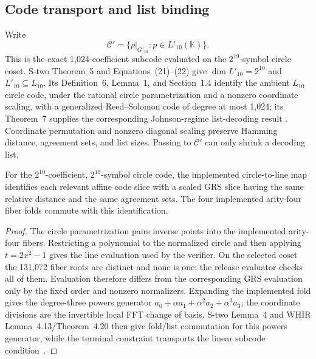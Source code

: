 \subsection{Code transport and list binding}

Write
\[
 \mathcal C'=
 \{p|_{G'_{19}}:p\in L'_{10}(\mathbb K)\}.
\]
This is the exact 1,024-coefficient subcode evaluated on the
\(2^{19}\)-symbol circle coset.  S-two Theorem~5 and
Equations~(21)--(22) give \(\dim L'_{10}=2^{10}\) and
\(L'_{10}\subseteq L_{10}\).  Its Definition~6, Lemma~1, and Section~1.4
identify the ambient \(L_{10}\) circle code, under the rational circle
parametrization and a nonzero coordinate scaling, with a generalized
Reed--Solomon code of degree at most 1,024; its Theorem~7 supplies the
corresponding Johnson-regime list-decoding result
\cite{CarmonEtAl2026Stwo}.  Coordinate permutation and nonzero diagonal
scaling preserve Hamming distance, agreement sets, and list sizes.  Passing
to \(\mathcal C'\) can only shrink a decoding list.

\begin{lemma}
\label{lem:circle-grs-transport}
For the \(2^{10}\)-coefficient, \(2^{19}\)-symbol \Profile{} circle code,
the implemented circle-to-line map identifies each relevant affine code
slice with a scaled GRS slice having the same relative distance and the same
agreement sets.  The four implemented arity-four fiber folds commute with
this identification.
\end{lemma}

\begin{proof}
The circle parametrization pairs inverse points into the implemented
arity-four fibers.  Restricting a polynomial to the normalized circle and
then applying \(t=2x^2-1\) gives the line evaluation used by the verifier.
On the selected coset the 131,072 fiber roots are distinct and none is one;
the release evaluator checks all of them.  Evaluation therefore differs
from the corresponding GRS evaluation only by the fixed order and nonzero
normalizers.  Expanding the implemented fold gives the degree-three powers
generator \(a_0+\alpha a_1+\alpha^2a_2+\alpha^3a_3\); the coordinate
divisions are the invertible local FFT change of basis.  S-two Lemma~4 and
WHIR Lemma~4.13/Theorem~4.20 then give fold/list commutation for this powers
generator, while the terminal constraint transports the linear subcode
condition~\cite{CarmonEtAl2026Stwo,ArnonChiesaFenziYogev2025WHIR}.
\end{proof}

